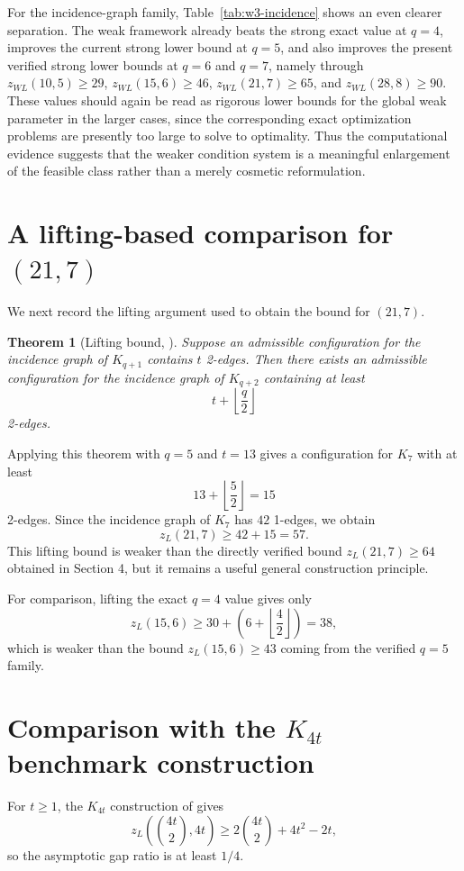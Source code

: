 \documentclass[10pt]{article}
\newcommand{\blue}[1]{#1}
\newcommand{\0}{\mathbf{0}}
\newcommand{\1}{\mathbf{1}}
\newtheorem{Thm}{Theorem}[section]
\begin{document}
\blue{For the incidence-graph family, Table~\ref{tab:w3-incidence} shows an even clearer separation. The weak framework already beats the strong exact value at \(q=4\), improves the current strong lower bound at \(q=5\), and also improves the present verified strong lower bounds at \(q=6\) and \(q=7\), namely through \(z_{WL}(10,5)\ge 29\), \(z_{WL}(15,6)\ge 46\), \(z_{WL}(21,7)\ge 65\), and \(z_{WL}(28,8)\ge 90\). These values should again be read as rigorous lower bounds for the global weak parameter in the larger cases, since the corresponding exact optimization problems are presently too large to solve to optimality. Thus the computational evidence suggests that the weaker condition system is a meaningful enlargement of the feasible class rather than a merely cosmetic reformulation.}
\section{\blue{A lifting-based comparison for \((21,7)\)}}

We next record the lifting argument used to obtain the bound for \((21,7)\).

\begin{Thm}[Lifting bound, \cite{QCX26b}]
Suppose an admissible configuration for the incidence graph of \(K_{q+1}\) contains \(t\) 2-edges. Then there exists an admissible configuration for the incidence graph of \(K_{q+2}\) containing at least
\[
t+\left\lfloor \frac{q}{2}\right\rfloor
\]
2-edges.
\end{Thm}

Applying this theorem with \(q=5\) and \(t=13\) gives a configuration for \(K_7\) with at least
\[
13+\left\lfloor\frac52\right\rfloor=15
\]
2-edges. Since the incidence graph of \(K_7\) has \(42\) 1-edges, we obtain
\[
z_L(21,7)\ge 42+15=57.
\]
\blue{This lifting bound is weaker than the directly verified bound \(z_L(21,7)\ge 64\) obtained in Section 4, but it remains a useful general construction principle.}

For comparison, lifting the exact \(q=4\) value gives only
\[
z_L(15,6)\ge 30+\left(6+\left\lfloor\frac42\right\rfloor\right)=38,
\]
which is weaker than the bound \(z_L(15,6)\ge 43\) coming from the verified \(q=5\) family.

\section{Comparison with the \(K_{4t}\) benchmark construction}

For \(t\ge 1\), the \(K_{4t}\) construction of \cite{QCX26b} gives
\[
z_L\!\left(\binom{4t}{2},4t\right)\ge 2\binom{4t}{2}+4t^2-2t,
\]
so the asymptotic gap ratio is at least \(1/4\).
\end{document}
